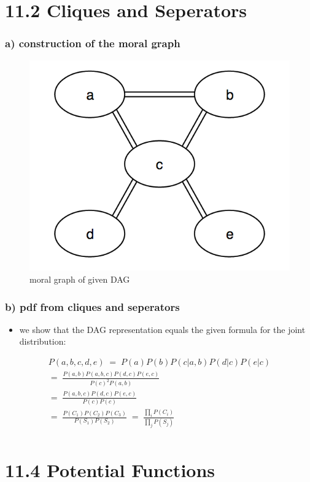 \documentclass[10 pt]{beamer}
\begin{document}
\section*{11.2 Cliques and Seperators}

\begin{frame}
  \frametitle{a) construction of the moral graph}

\begin{figure}[h]
  \centering
  \includegraphics[width=6 cm]{moral_graph.png}
  \caption{moral graph of given DAG}
\end{figure}

\end{frame}
\begin{frame}
  \frametitle{b) pdf from cliques and seperators}

\begin{itemize}
\item we show that the DAG representation equals the given formula for the joint distribution:
\end{itemize}

\begin{eqnarray}
P(a,b,c,d,e) \;=\; P(a)P(b)P(c|a,b)P(d|c)P(e|c) \\
=\; \frac{P(a,b)P(a,b,c)P(d,c)P(e,c)}{P(c)^2P(a,b)} \\
=\; \frac{P(a,b,c)P(d,c)P(e,c)}{P(c)P(c)}\\
=\; \frac{P(C_1)P(C_2)P(C_3)}{P(S_1)P(S_2)}\;=\; \frac{\prod_i P(C_i)}{\prod_j P(S_j)} \\
\end{eqnarray}


\end{frame}

\section*{11.4 Potential Functions}
\end{document}
